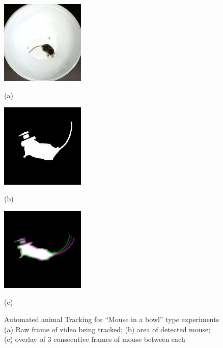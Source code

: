 \begin{figure}[htb]
  \begin{minipage}[t]{0.32\linewidth}\centering
    \includegraphics[width=4cm]{01raw.jpg}
    \centerline{(a)}
  \end{minipage}\hfill
  \begin{minipage}[t]{0.32\linewidth}\centering
    \includegraphics[width=4cm]{02black-and-white.jpg}
        \centerline{(b)}
  \end{minipage}
  \begin{minipage}[t]{0.32\linewidth}\centering
    \includegraphics[width=4cm]{03twoframes.jpg}
    \centerline{(c)}
  \end{minipage}
  \caption{Automated animal Tracking for ``Mouse in a bowl'' type experiments (a) Raw frame of video being tracked; (b) area of detected mouse; (c) overlay of 3 consecutive frames of mouse between each}
  \label{fig:Sampling}
\end{figure}

